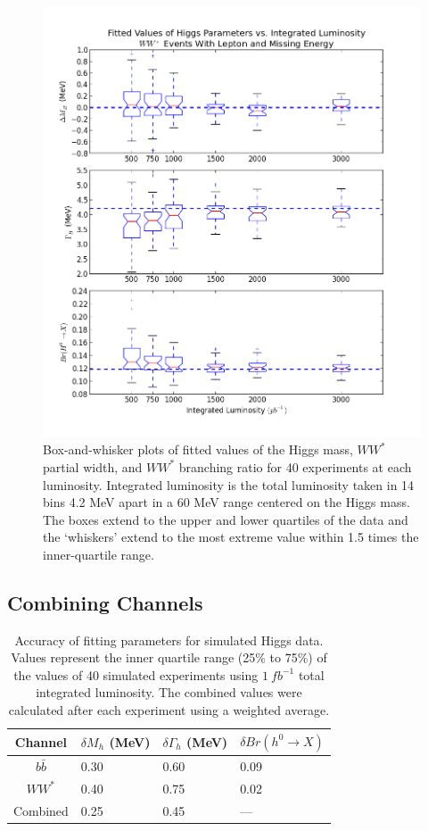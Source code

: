 \documentclass[a4paper]{article}
\begin{document}
\begin{figure}
	\includegraphics[width=\textwidth]{fitted-vals-boxpl-ww}
	\caption{Box-and-whisker plots of fitted values of the Higgs mass, $WW^*$ partial width, and $WW^*$ branching ratio for 40 experiments at each luminosity. Integrated luminosity is the total luminosity taken in 14 bins 4.2 MeV apart in a 60 MeV range centered on the Higgs mass. The boxes extend to the upper and lower quartiles of the data and the `whiskers' extend to the most extreme value within 1.5 times the inner-quartile range.\label{fig:fitted-vals-boxpl-ww}}
\end{figure}

\subsection{Combining Channels}
\begin{table}
	\begin{center}
		\begin{tabular}{|c|l|l|l|}
			\hline
			Channel	& $\delta M_h$ (MeV)	& $\delta \Gamma_h$ (MeV)	& $\delta Br(h^0\rightarrow X)$ \\ \hline
			$b\bar{b}$	& 0.30	& 0.60	& 0.09	\\ \hline
			$WW^*$		& 0.40	& 0.75	& 0.02	\\ \hline
			Combined	& 0.25	& 0.45	& ---	\\ \hline
		\end{tabular}
	\end{center}
	\caption{Accuracy of fitting parameters for simulated Higgs data. Values represent the inner quartile range (25\% to 75\%) of the values of 40 simulated experiments using $1~fb^{-1}$ total integrated luminosity. The combined values were calculated after each experiment using a weighted average.\label{table:fitted-vals-boxpl}}
\end{table}
\end{document}
